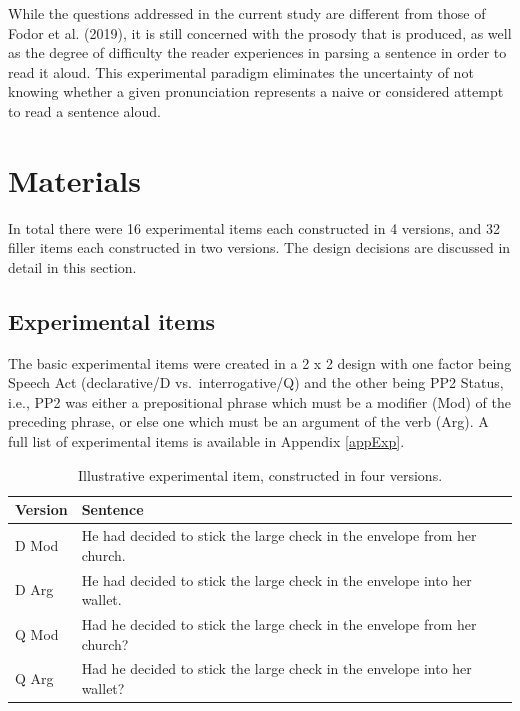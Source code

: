 \documentclass[11pt,oneside]{book}
\begin{document}
While the questions addressed in the current study are different from those of Fodor et al. (2019), it is still concerned with the prosody that is produced, as well as the degree of difficulty the reader experiences in parsing a sentence in order to read it aloud. This experimental paradigm eliminates the uncertainty of not knowing whether a given pronunciation represents a naive or considered attempt to read a sentence aloud.

\hypertarget{mat}{%
\section{Materials}\label{mat}}

In total there were 16 experimental items each constructed in 4 versions, and 32 filler items each constructed in two versions. The design decisions are discussed in detail in this section.

\hypertarget{exps}{%
\subsection{Experimental items}\label{exps}}

The basic experimental items were created in a 2 x 2 design with one factor being Speech Act (declarative/D vs.~interrogative/Q) and the other being PP2 Status, i.e., PP2 was either a prepositional phrase which must be a modifier (Mod) of the preceding phrase, or else one which must be an argument of the verb (Arg). A full list of experimental items is available in Appendix \ref{appExp}.

\begin{table}[H]

\caption{\label{tab:sentences}Illustrative experimental item, constructed in four versions.}
\centering
\begin{tabular}{ll}
\toprule
Version & Sentence\\
\midrule
D Mod & He had decided to stick the large check in the envelope from her church.\\
D Arg & He had decided to stick the large check in the envelope into her wallet.\\
Q Mod & Had he decided to stick the large check in the envelope from her church?\\
Q Arg & Had he decided to stick the large check in the envelope into her wallet?\\
\bottomrule
\end{tabular}
\end{table}
\end{document}
